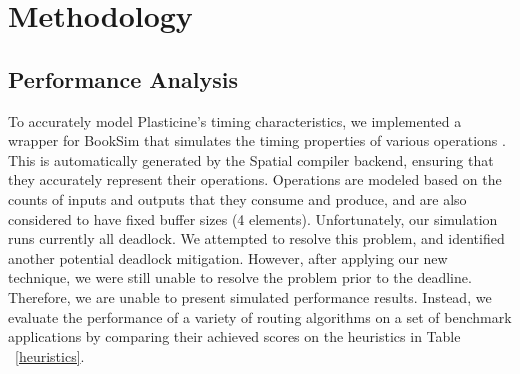 \section{Methodology}
\label{sec:method}
\subsection{Performance Analysis}
To accurately model Plasticine's timing characteristics, we implemented a wrapper for BookSim that simulates the timing properties of various operations \cite{booksim}.
This is automatically generated by the Spatial compiler backend, ensuring that they accurately represent their operations.
Operations are modeled based on the counts of inputs and outputs that they consume and produce, and are also considered to have fixed buffer sizes (4 elements).
Unfortunately, our simulation runs currently all deadlock.
We attempted to resolve this problem, and identified another potential deadlock
mitigation. However, after applying our new technique, we were still unable to
resolve the problem prior to the deadline. Therefore, we are unable to present simulated performance results. Instead, we evaluate the performance of a variety of routing algorithms on a set of benchmark applications by comparing their achieved scores on the heuristics in Table ~\ref{heuristics}. 

